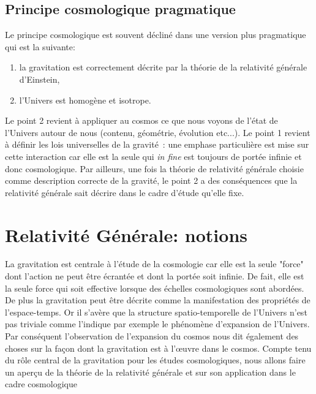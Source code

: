 \subsection{Principe cosmologique pragmatique}
Le principe cosmologique est souvent décliné dans une version plus pragmatique qui est la suivante:
\begin{enumerate}
\item la gravitation est correctement décrite par la théorie de la relativité générale d'Einstein,
\item l'Univers est homogène et isotrope.
\end{enumerate}
Le point 2 revient à appliquer au cosmos ce que nous voyons de l'état de l'Univers autour de nous (contenu, géométrie, évolution etc...). Le point 1 revient à définir les lois universelles de la gravité~: une emphase particulière est mise sur cette interaction car elle est la seule qui \textit{in fine} est toujours de portée infinie et donc cosmologique. Par ailleurs, une fois la théorie de relativité générale choisie comme description correcte de la gravité, le point 2 a des conséquences que la relativité générale sait décrire dans le cadre d'étude qu'elle fixe.

\section{Relativité Générale: notions}
La gravitation est centrale à l'étude de la cosmologie car elle est la seule "force" dont l'action ne peut être écrantée et dont la portée soit infinie. De fait, elle est la seule force qui soit effective lorsque des échelles cosmologiques sont abordées. De plus la gravitation peut être décrite comme la manifestation des propriétés de l'espace-temps. Or il s'avère que la structure spatio-temporelle de l'Univers n'est pas triviale comme l'indique par exemple le phénomène d'expansion de l'Univers. Par conséquent l'observation de l'expansion du cosmos nous dit également des choses sur la façon dont la gravitation est à l'œuvre dans le cosmos. Compte tenu du rôle central de la gravitation pour les études cosmologiques, nous allons faire un aperçu de la théorie de la relativité générale et sur son application dans le cadre cosmologique

